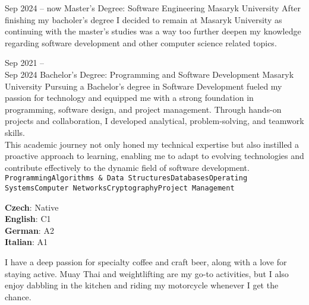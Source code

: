 \documentclass[9pt]{cv}
\begin{document}

\begin{entrylist}
	\entry
		{Sep 2024 -- now}
		{Master's Degree: Software Engineering}
		{Masaryk University}
        {After finishing my bacholer's degree I decided to remain at Masaryk University as continuing with the master's studies was a way too further deepen my knowledge regarding software development and other computer science related topics.}
\end{entrylist}

\begin{entrylist}
	\entry
		{Sep 2021 -- \\ Sep 2024}
		{Bachelor's Degree: Programming and Software Development}
		{Masaryk University}
        {Pursuing a Bachelor's degree in Software Development fueled my passion for technology and equipped me with a strong foundation in programming, software design, and project management. Through hands-on projects and collaboration, I developed analytical, problem-solving, and teamwork skills.\\ This academic journey not only honed my technical expertise but also instilled a proactive approach to learning, enabling me to adapt to evolving technologies and contribute effectively to the dynamic field of software development.\\ \texttt{Programming}\slashsep\texttt{Algorithms \& Data Structures}\slashsep\texttt{Databases}\slashsep\texttt{Operating Systems}\slashsep\texttt{Computer Networks}\slashsep\texttt{Cryptography}\slashsep\texttt{Project Management}}
\end{entrylist}

\begin{minipage}[t]{0.3\textwidth}
	\vspace{-\baselineskip} %


	\textbf{Czech}: Native\\
	\textbf{English}: C1\\
	\textbf{German}: A2\\
	\textbf{Italian}: A1
\end{minipage}
\hfill
\begin{minipage}[t]{0.7\textwidth}
	\vspace{-\baselineskip} %
	

    I have a deep passion for specialty coffee and craft beer, along with a love for staying active. Muay Thai and weightlifting are my go-to activities, but I also enjoy dabbling in the kitchen and riding my motorcycle whenever I get the chance.
\end{minipage}
% 	
% 	
\end{document}
